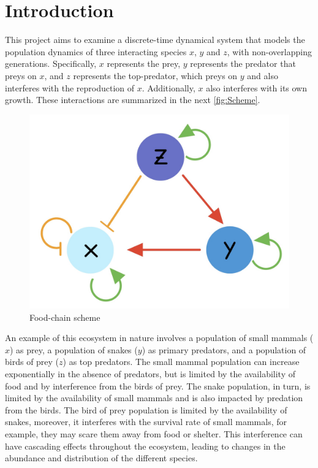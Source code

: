 \documentclass[10pt]{Configuration_Files/PoliMi3i_thesis}
\begin{document}
\mainmatter %


\chapter{Introduction}
\label{ch:}

This project aims to examine a discrete-time dynamical system that models the population dynamics of three interacting species $x$, $y$ and $z$, with non-overlapping generations. Specifically, $x$ represents the prey, $y$ represents the predator that preys on $x$, and $z$ represents the top-predator, which preys on $y$ and also interferes with the reproduction of $x$. Additionally, $x$ also interferes with its own growth. These interactions are summarized in the next \autoref{fig:Scheme}. 

\begin{figure}[h]
\centering
   \includegraphics[scale=0.10]{images/Chapter 1/prey_pred.jpg} 
   \caption{Food-chain scheme}
   \label{fig:Scheme}
\end{figure}

An example of this ecosystem in nature involves a population of small mammals ($x$) as prey, a population of snakes ($y$) as primary predators, and a population of birds of prey ($z$) as top predators. The small mammal population can increase exponentially in the absence of predators, but is limited by the availability of food and by interference from the birds of prey. The snake population, in turn, is limited by the availability of small mammals and is also impacted by predation from the birds. The bird of prey population is limited by the availability of snakes, moreover, it interferes with the survival rate of small mammals, for example, they may scare them away from food or shelter. This interference can have cascading effects throughout the ecosystem, leading to changes in the abundance and distribution of the different species.
\end{document}
